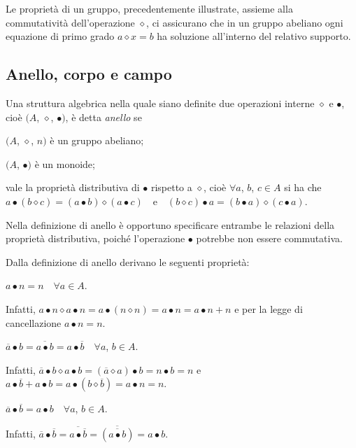 Le proprietà di un gruppo, precedentemente illustrate, assieme alla commutatività dell'operazione $\diamond$, ci assicurano che in un gruppo abeliano ogni equazione di primo grado $a\diamond x = b$ ha soluzione all'interno del relativo supporto.

\ovalbox{\risolvii \ref{ese:E.17}, \ref{ese:E.18}}

\subsection{Anello, corpo e campo}

\begin{definizione}
Una struttura algebrica nella quale siano definite due operazioni interne $\diamond$ e $\bullet$, cioè $(A$, $\diamond$, $\bullet)$, è detta \emph{anello} se
\begin{itemize*}
\item $(A$, $\diamond$, $n)$ è un gruppo abeliano;
\item $(A$, $\bullet)$ è un monoide;
\item vale la proprietà distributiva di $\bullet$ rispetto a $\diamond$, cioè $\forall a$, $b$, $c \in A$ si ha che $a\bullet (b\diamond c) = (a\bullet b) \diamond (a \bullet c)$~~e~~$(b\diamond c)\bullet a = (b \bullet a) \diamond (c \bullet a)$.
\end{itemize*}
\end{definizione}

\osservazione Nella definizione di anello è opportuno specificare entrambe le relazioni della proprietà distributiva, poiché l'operazione $\bullet$ potrebbe non essere commutativa.

Dalla definizione di anello derivano le seguenti proprietà:
\begin{itemize*}
\item $a \bullet n = n\quad \forall a \in A$.

Infatti, $a \bullet n \diamond a \bullet n = a \bullet (n \diamond n) = a \bullet n = a \bullet n + n$ e per la legge di cancellazione $a \bullet n = n$.

\item $\overline{a} \bullet b = \overline{a \bullet b} = a \bullet \overline{b}\quad \forall a$, $b \in A$.

Infatti, $\overline{a} \bullet b \diamond a \bullet b = (\overline{a} \diamond a) \bullet b = n \bullet b = n$ e $a \bullet \overline{b} + a \bullet b = a \bullet (b \diamond \overline{b}) = a \bullet n = n$.

\item $\overline{a} \bullet \overline{b} = a \bullet b \quad \forall a$, $b \in A$.

Infatti, $\overline{a} \bullet \overline{b} = \overline{a \bullet \overline{b}} = \overline{(\overline{a \bullet b})} = a \bullet b$.
\end{itemize*}

